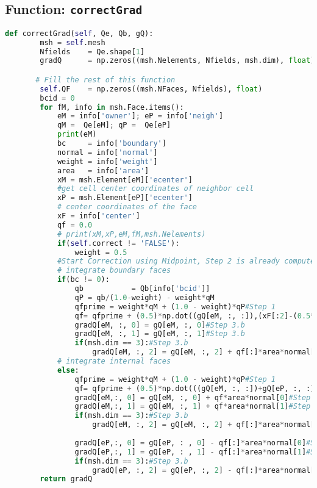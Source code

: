 \documentclass{article}
\begin{document}
\subsection*{Function: \texttt{correctGrad}}
\begin{lstlisting}[language=Python]
    def correctGrad(self, Qe, Qb, gQ):
        msh = self.mesh
        Nfields    = Qe.shape[1]
        gradQ      = np.zeros((msh.Nelements, Nfields, msh.dim), float)

       # Fill the rest of this function 
        self.QF    = np.zeros((msh.NFaces, Nfields), float)
        bcid = 0
        for fM, info in msh.Face.items():
            eM = info['owner']; eP = info['neigh']
            qM =  Qe[eM]; qP =  Qe[eP]
            print(eM)
            bc     = info['boundary']
            normal = info['normal']
            weight = info['weight']
            area   = info['area']
            xM = msh.Element[eM]['ecenter']
            #get cell center coordinates of neighbor cell
            xP = msh.Element[eP]['ecenter']
            # center coordinates of the face
            xF = info['center']
            qf = 0.0
            # print(xM,xP,eM,fM,msh.Nelements)
            if(self.correct != 'FALSE'):
                weight = 0.5
            #Start Correction using Midpoint, Step 2 is already computed as gQ
            # integrate boundary faces
            if(bc != 0):
                qb           = Qb[info['bcid']]
                qP = qb/(1.0-weight) - weight*qM
                qfprime = weight*qM + (1.0 - weight)*qP#Step 1
                qf= qfprime + (0.5)*np.dot((gQ[eM, :, :]),(xF[:2]-(0.5*(xM[:2]+xP[:2]))))#Step 3.a
                gradQ[eM, :, 0] = gQ[eM, :, 0]#Step 3.b
                gradQ[eM, :, 1] = gQ[eM, :, 1]#Step 3.b
                if(msh.dim == 3):#Step 3.b
                    gradQ[eM, :, 2] = gQ[eM, :, 2] + qf[:]*area*normal[2]#Step 3.b
            # integrate internal faces
            else:
                qfprime = weight*qM + (1.0 - weight)*qP#Step 1
                qf= qfprime + (0.5)*np.dot(((gQ[eM, :, :])+gQ[eP, :, :]),(xF[:2]-(0.5*(xM[:2]+xP[:2]))))#Step 3.a
                gradQ[eM,:, 0] = gQ[eM, :, 0] + qf*area*normal[0]#Step 3.b
                gradQ[eM,:, 1] = gQ[eM, :, 1] + qf*area*normal[1]#Step 3.b
                if(msh.dim == 3):#Step 3.b
                    gradQ[eM, :, 2] = gQ[eM, :, 2] + qf[:]*area*normal[2]#Step 3.b
                
                gradQ[eP,:, 0] = gQ[eP, : , 0] - qf[:]*area*normal[0]#Step 3.b
                gradQ[eP,:, 1] = gQ[eP, : , 1] - qf[:]*area*normal[1]#Step 3.b
                if(msh.dim == 3):#Step 3.b
                    gradQ[eP, :, 2] = gQ[eP, :, 2] - qf[:]*area*normal[2]#Step 3.b
        return gradQ
\end{lstlisting}
\end{document}
